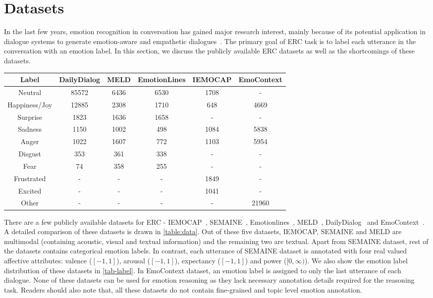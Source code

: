 \documentclass{IEEEtran}\usepackage[pdftex]{graphicx}
\begin{document}
	\section{Datasets}
	\label{sec:datasets}
	In the last few years, emotion recognition in conversation has gained major research interest, mainly because of its potential application in dialogue systems to generate emotion-aware and empathetic dialogues~\citep{zhou2018emotional}. The primary goal of ERC task is to label each utterance in the conversation with an emotion label. In this section, we discuss the publicly available ERC datasets as well as the shortcomings of these datasets.
	\begin{table*}[t]
		\centering
		\begin{tabular}{cccccc}
			\toprule
			
			Label & DailyDialog & MELD & EmotionLines & IEMOCAP & EmoContext\\
			\midrule
			Neutral & 85572 & 6436 & 6530 & 1708 & -\\
			Happiness/Joy & 12885 & 2308 & 1710 & 648 & 4669\\
			Surprise & 1823 & 1636 & 1658 & - & -\\
			Sadness & 1150 & 1002 & 498 & 1084 & 5838\\
			Anger & 1022 & 1607 & 772 & 1103 & 5954\\
			Disgust & 353 & 361 & 338 & - & -\\
			Fear & 74 & 358 & 255 & - & -\\
			Frustrated & - & - & - & 1849 & -\\
			Excited & - & - & - & 1041 & -\\
			Other & - & - & - & - & 21960\\
			\bottomrule
		\end{tabular}
		\caption{Label distribution statistics in different Emotion Recognition datasets.}
		\label{tab-label}
	\end{table*}
	There are a few publicly available datasets for ERC - IEMOCAP~\citep{busso2008iemocap}, SEMAINE~\citep{mckeown2012semaine}, Emotionlines~\citep{chen2018emotionlines}, MELD~\citep{poria2018meld}, DailyDialog~\citep{li2017dailydialog} and EmoContext~\citep{chatterjee2019understanding}. A detailed comparison of these datasets is drawn in \cref{table:data}. Out of these five datasets, IEMOCAP, SEMAINE and MELD are multimodal (containing acoustic, visual and textual information) and the remaining two are textual. Apart from SEMAINE dataset, rest of the datasets contains categorical emotion labels. In contrast, each utterance of SEMAINE dataset is annotated with
	four real valued affective attributes: valence ($[-1,1]$), arousal ($[-1,1]$),
	expectancy ($[-1,1]$) and power ($[0,\infty)$).  We also show the emotion label distribution of these datasets in \cref{tab-label}. In EmoContext dataset, an emotion label is assigned to only the last utterance of each dialogue.
	None of these datasets can be used for emotion reasoning as they lack necessary annotation details required for the reasoning task. Readers should also note that, all these datasets do not contain fine-grained and topic level emotion annotation.
	
\end{document}
